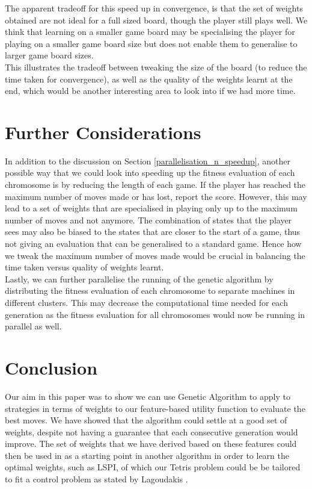 \documentclass[a4paper,12pt,twocolumn]{article}
\begin{document}
The apparent tradeoff for this speed up in convergence, is that the set of weights
obtained are not ideal for a full sized board, though the player still plays well.
We think that learning on a smaller game board may be specialising the player for playing on
a smaller game board size but does not enable them to generalise to larger game board sizes.\\

This illustrates the tradeoff between tweaking the size of the board (to
reduce the time taken for convergence), as well as the quality of the weights
learnt at the end, which would be another interesting area to look into if we had
more time.

\section{Further Considerations}

In addition to the discussion on Section \ref{parallelisation_n_speedup},
another possible way that we could look into speeding up the fitness evaluation
of each chromosome is by reducing the length of each game. If the player has reached
the maximum number of moves made or has lost, report the score. However, this may
lead to a set of weights that are specialised in playing only up to the maximum
number of moves and not anymore. The combination of states that the player sees may
also be biased to the states that are closer to the start of a game, thus not
giving an evaluation that can be generalised to a standard game. Hence how we
tweak the maximum number of moves made would be crucial in balancing the
time taken versus quality of weights learnt.\\

Lastly, we can further parallelise the running of the genetic algorithm by distributing
the fitness evaluation of each chromosome to separate machines in different
clusters. This may decrease the computational time needed for each generation as the
fitness evaluation for all chromosomes would now be running in parallel as well.

\section{Conclusion}
Our aim in this paper was to show we can use Genetic Algorithm to apply to strategies
in terms of weights to our feature-based utility function to evaluate the best moves.
We have showed that the algorithm could settle at a good set of weights, despite
not having a guarantee that each consecutive generation would improve. The set of weights
that we have derived based on these features could then be used in as a starting point
in another algorithm in order to learn the optimal weights, such as LSPI, of which our
Tetris problem could be be tailored to fit a control problem as stated by Lagoudakis \cite{lagoudakis}.\\
\end{document}
